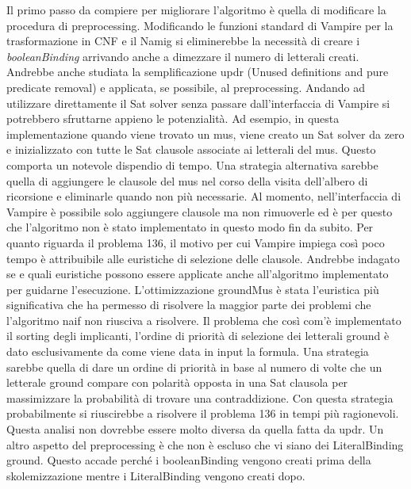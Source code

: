 \documentclass[./main.tex]{subfiles}
\begin{document}
Il primo passo da compiere per migliorare l'algoritmo è quella di modificare la procedura di preprocessing.
Modificando le funzioni standard di Vampire per la trasformazione in CNF e il Namig si
eliminerebbe la necessità di creare i \textit{booleanBinding} arrivando anche a dimezzare il numero di letterali creati.
Andrebbe anche studiata la semplificazione updr (Unused definitions and pure predicate removal) e 
applicata, se possibile, al preprocessing.
Andando ad utilizzare direttamente il Sat solver senza passare dall'interfaccia di Vampire 
si potrebbero sfruttarne appieno le potenzialità. 
Ad esempio, in questa implementazione quando viene trovato un mus, viene creato un Sat solver da zero e inizializzato con tutte le Sat clausole associate ai letterali del mus.
Questo comporta un notevole dispendio di tempo. 
Una strategia alternativa sarebbe quella di aggiungere le clausole del mus nel corso della visita dell'albero di ricorsione 
e eliminarle quando non più necessarie. 
Al momento, nell'interfaccia di Vampire è possibile solo aggiungere clausole ma non rimuoverle ed 
è per questo che l'algoritmo non è stato implementato in questo modo fin da subito.
Per quanto riguarda il problema 136, il motivo per cui Vampire impiega così poco tempo 
è attribuibile alle euristiche di selezione delle clausole. 
Andrebbe indagato se e quali euristiche possono essere applicate anche all'algoritmo implementato per guidarne l'esecuzione.
L'ottimizzazione groundMus è stata l'euristica più significativa che ha permesso di risolvere la maggior parte dei problemi
che l'algoritmo naif non riusciva a risolvere.
Il problema che così com'è implementato il sorting degli implicanti, l'ordine di priorità di selezione dei letterali ground è dato esclusivamente da come 
viene data in input la formula. 
Una strategia sarebbe quella di dare un ordine di priorità in base al numero di volte che un letterale ground compare
con polarità opposta in una Sat clausola per massimizzare la probabilità di trovare una contraddizione.
Con questa strategia probabilmente si riuscirebbe a risolvere il problema 136 in tempi più ragionevoli.
Questa analisi non dovrebbe essere molto diversa da quella fatta da updr.
Un altro aspetto del preprocessing è che non è escluso che vi siano dei LiteralBinding ground.
Questo accade perché i booleanBinding vengono creati prima della skolemizzazione mentre i LiteralBinding vengono creati dopo.
\end{document}
